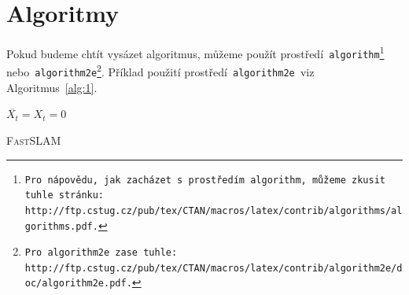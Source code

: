 \documentclass[a4paper, 11pt]{article}
\begin{document}
\section{Algoritmy} \label{sec:3}
Pokud budeme chtít vysázet algoritmus, můžeme použít prostředí\texttt{ algorithm\footnote{Pro nápovědu, jak zacházet s~prostředím\texttt{ algorithm,} můžeme zkusit tuhle stránku:\\http://ftp.cstug.cz/pub/tex/CTAN/macros/latex/contrib/algorithms/algorithms.pdf.} } nebo\texttt{ algorithm2e\footnote{Pro\texttt{ algorithm2e }zase tuhle: {http://ftp.cstug.cz/pub/tex/CTAN/macros/latex/contrib/algorithm2e/doc/algorithm2e.pdf.}}}. Příklad použití prostředí\texttt{ algorithm2e }viz Algoritmus~\ref{alg:1}.
\bigskip
\DontPrintSemicolon
\begin{algorithm}
    \BlankLine
    \SetNlSkip{-1em}
    \SetNlSty{}{}{:}
    \Indp\Indp
    $ \overline{X_t} = X_{t} = 0 $\;
    \
    \caption{\textsc{FastSLAM}}
    \label{alg:1}
\end{algorithm}
\end{document}
